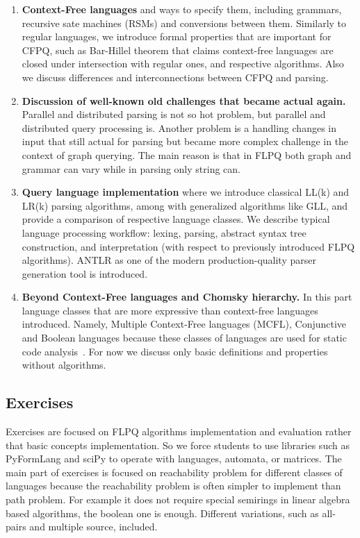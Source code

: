 \documentclass[sigconf]{acmart}
\begin{document}
\begin{enumerate}
  \item \label{cf_languages_intro} \textbf{Context-Free languages} and ways to specify them, including grammars, recursive sate machines (RSMs) and conversions between them.
  Similarly to regular languages, we introduce formal properties that are important for CFPQ, such as Bar-Hillel theorem that claims context-free languages are closed under intersection with regular ones, and respective algorithms.
  Also we discuss differences and interconnections between CFPQ and parsing.
  
  \item \label{new_old_problems_discussion} \textbf{Discussion of well-known old challenges that became actual again.} 
  Parallel and distributed parsing is not so hot problem, but parallel and distributed query processing is. 
  Another problem is a handling changes in input that still actual for parsing but became more complex challenge in the context of graph querying.
  The main reason is that in FLPQ both graph and grammar can vary while in parsing only string can.
  
  \item \label{parsing_techniques} \textbf{Query language implementation}
  where we introduce classical LL(k) and LR(k) parsing algorithms, among with generalized algorithms like GLL, and provide a comparison of respective language classes.
  We describe typical language processing workflow: lexing, parsing, abstract syntax tree construction, and interpretation (with respect to previously introduced FLPQ algorithms).
  ANTLR as one of the modern production-quality parser generation tool is introduced.
  
  \item \label{beyond_chomsky_hierarchy} \textbf{Beyond Context-Free languages and Chomsky hierarchy.}
  In this part language classes that are more expressive than context-free languages introduced. 
  Namely, Multiple Context-Free languages (MCFL), Conjunctive and Boolean languages because these classes of languages are used for static code analysis~\cite{10.1145/3009837.3009848, 10.1145/3704854}. 
  For now we discuss only basic definitions and properties without algorithms. 
\end{enumerate}


\subsection{Exercises}

Exercises are focused on FLPQ algorithms implementation and evaluation rather that basic concepts implementation.
So we force students to use libraries such as PyFormLang and sciPy to operate with languages, automata, or matrices.
The main part of exercises is focused on reachability problem for different classes of languages because the reachability problem is often simpler to implement than path problem.
For example it does not require special semirings in linear algebra based algorithms, the boolean one is enough.  
Different variations, such as all-pairs and multiple source, included.
\end{document}
